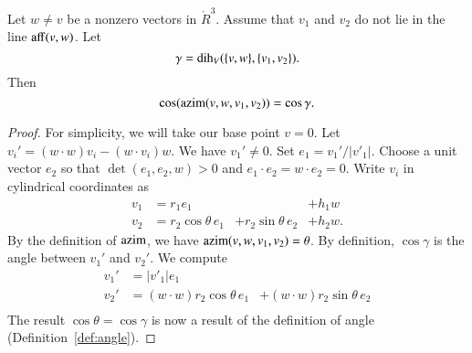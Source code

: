 \begin{lemma}\label{lemma:dih-azim}
Let $w\ne v$ be a nonzero vectors in $\ring{R}^3$.
  Assume that $v_1$ and $v_2$ do not lie in the line ${\operatorname{aff}}(v,w)$.
Let
  $$\gamma = \operatorname{dih}_V(\{v,w\},\{v_1,v_2\}).$$
  Then
    $$
    \cos({\operatorname{azim}}(v,w,v_1,v_2)) = \cos\gamma.
    $$
\end{lemma}

\begin{proof}  For simplicity,
we will take our base point $v=0$.
Let $v_i' = (w\cdot w) v_i - (w\cdot v_i) w$.  
We have $v_1'\ne 0$.  Set $e_1 = v_1'/|v'_1|$.  Choose a unit vector
$e_2$ so that $\det(e_1,e_2,w)>0$ and $e_1\cdot e_2 = w\cdot e_2=0$.
Write $v_i$ in cylindrical coordinates as 
   $$
   \begin{array}{lllll}
     v_1 &= r_1 e_1 &    &+h_1 w\\
     v_2 &= r_2 \cos\theta\, e_1 &+ r_2 \sin\theta\, e_2 &+ h_2 w.
    \end{array}
   $$
By the definition of ${\operatorname{azim}}$, we have ${\operatorname{azim}}(v,w,v_1,v_2)=\theta$.  
By definition, $\cos\gamma$ is the angle between $v_1'$ and $v_2'$.
We compute
   $$
   \begin{array}{lll}
     v_1' &= |v'_1| e_1 \\
     v_2' &= (w\cdot w) r_2 \cos\theta\, e_1 
       &+ (w\cdot w) r_2 \sin\theta\, e_2 \\
     \end{array}
   $$
The result $\cos\theta=\cos\gamma$ 
is now a result of the definition of angle 
(Definition~\ref{def:angle}).
\end{proof}





